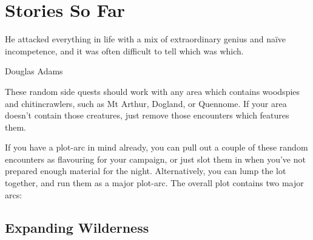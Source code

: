 \chapter{Stories So Far}
	\epigraph{He attacked everything in life with a mix of extraordinary genius and na\"ive incompetence, and it was often difficult to tell which was which.}{Douglas Adams}

\begin{multicols}{2}

These random side quests should work with any area which contains woodspies and chitincrawlers, such as Mt Arthur, Dogland, or Quennome.
If your area doesn't contain those creatures, just remove those encounters which features them.

If you have a plot-arc in mind already, you can pull out a couple of these random encounters as flavouring for your campaign, or just slot them in when you've not prepared enough material for the night.  Alternatively, you can lump the lot together, and run them as a major plot-arc.  The overall plot contains two major arcs:

\end{multicols}

\section{Expanding Wilderness}

